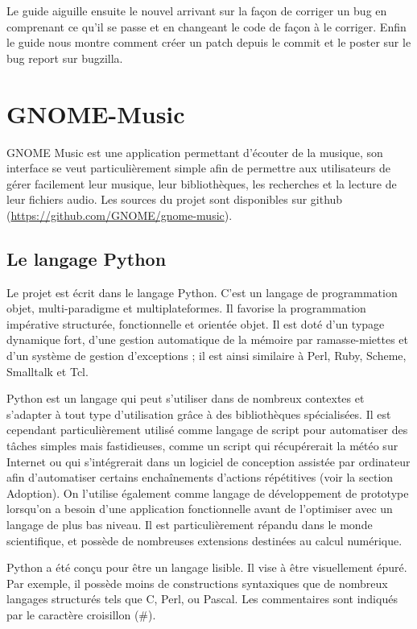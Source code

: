 \documentclass[12pt]{report}
\begin{document}
Le guide aiguille ensuite le nouvel arrivant sur la façon de corriger
un bug en comprenant ce qu'il se passe et en changeant le code de
façon à le corriger. Enfin le guide nous montre comment créer un
patch depuis le commit et le poster sur le bug report sur bugzilla.


\newpage
\chapter{GNOME-Music}
GNOME Music est une application permettant d'écouter de la musique, 
son interface se veut particulièrement simple afin de permettre aux
utilisateurs de gérer facilement leur musique, leur bibliothèques, 
les recherches et la lecture de leur fichiers audio.
Les sources du projet sont disponibles sur github 
(\url{https://github.com/GNOME/gnome-music}).

\section{Le langage Python}
Le projet est écrit dans le langage Python. C'est un langage de
programmation objet, multi-paradigme et multiplateformes. Il favorise la
programmation impérative structurée, fonctionnelle et orientée objet. 
Il est doté d'un typage dynamique fort, d'une gestion automatique de la 
mémoire par ramasse-miettes et d'un système de gestion d'exceptions ; 
il est ainsi similaire à Perl, Ruby, Scheme, Smalltalk et Tcl.

Python est un langage qui peut s'utiliser dans de nombreux contextes 
et s'adapter à tout type d'utilisation grâce à des bibliothèques 
spécialisées. Il est cependant particulièrement utilisé comme 
langage de script pour automatiser des tâches simples mais 
fastidieuses, comme un script qui récupérerait la météo sur Internet 
ou qui s'intégrerait dans un logiciel de conception assistée par 
ordinateur afin d'automatiser certains enchaînements d'actions 
répétitives (voir la section Adoption). On l'utilise également comme 
langage de développement de prototype lorsqu'on a besoin d'une 
application fonctionnelle avant de l'optimiser avec un langage 
de plus bas niveau. Il est particulièrement répandu dans le monde 
scientifique, et possède de nombreuses extensions destinées au 
calcul numérique.

Python a été conçu pour être un langage lisible. Il vise à être 
visuellement épuré. Par exemple, il possède moins de constructions 
syntaxiques que de nombreux langages structurés tels que C, 
Perl, ou Pascal. Les commentaires sont indiqués par le caractère 
croisillon (\#).
\end{document}
